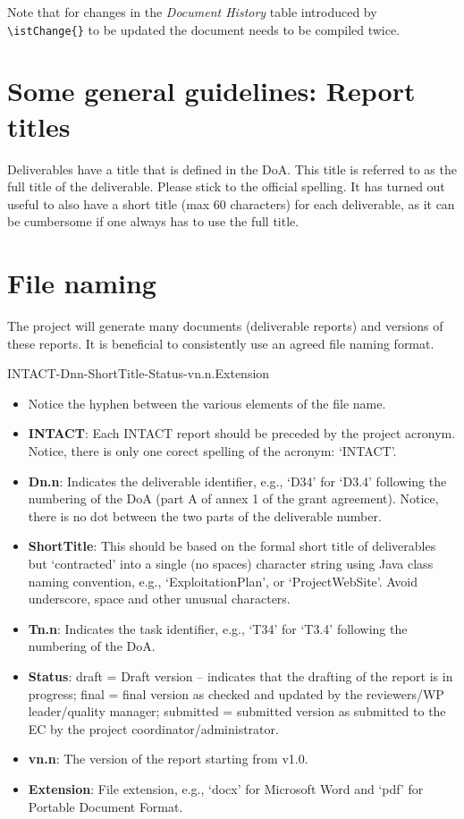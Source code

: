 \documentclass[10pt]{report}
\begin{document}
Note that for changes in the {\em Document History} table introduced
by \verb`\istChange{}` to be updated the document needs to be compiled twice.


\section{Some general guidelines: Report titles}

Deliverables have a title that is defined in the DoA. This title is
referred to as the full title of the deliverable. Please stick to the
official spelling. It has turned out useful to also have a short title
(max 60 characters) for each deliverable, as it can be cumbersome if
one always has to use the full title.

\section{File naming}

The project will generate many documents (deliverable reports) and
versions of these reports. It is beneficial to consistently use an
agreed file naming format.

INTACT-Dnn-ShortTitle-Status-vn.n.Extension

\begin{itemize}
\item Notice the hyphen between the various elements of the file name.
    \item {\bf INTACT}: Each INTACT report should be preceded by the project acronym. Notice, there is only one corect spelling of the acronym: ‘INTACT’. 
    \item {\bf Dn.n}: Indicates the deliverable identifier, e.g., ‘D34’ for ‘D3.4’ following the numbering of the DoA (part A of annex 1 of the grant agreement). Notice, there is no dot between the two parts of the deliverable number.
    \item {\bf ShortTitle}: This should be based on the formal short title of deliverables but ‘contracted’ into a single (no spaces) character string using Java class naming convention, e.g., ‘ExploitationPlan’,  or ‘ProjectWebSite’. Avoid underscore, space and other unusual characters.
    \item {\bf Tn.n}: Indicates the task identifier, e.g., ‘T34’ for ‘T3.4’ following the numbering of the DoA.
    \item {\bf Status}: 
draft = Draft version – indicates that the drafting of the report is in progress; 
final = final version as checked and updated by the reviewers/WP leader/quality manager; 
submitted = submitted version as submitted to the EC by the project coordinator/administrator.
    \item {\bf vn.n}: The version of the report starting from v1.0. 
    \item {\bf Extension}: File extension, e.g., ‘docx’ for Microsoft Word and ‘pdf’ for Portable Document Format. 
\end{itemize}
\end{document}
